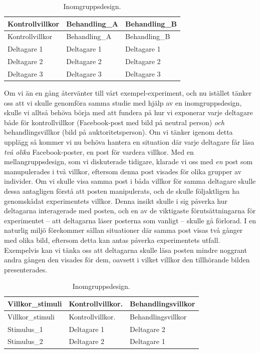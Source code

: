 \documentclass[
]{book}
\begin{document}
\begin{longtable}[]{@{}lll@{}}
\caption{\label{tab:tab-02-07-5-4-01}Inomgruppsdesign.}\tabularnewline
\toprule
Kontrollvillkor & Behandling\_A & Behandling\_B\tabularnewline
\midrule
\endfirsthead
\toprule
Kontrollvillkor & Behandling\_A & Behandling\_B\tabularnewline
\midrule
\endhead
Deltagare 1 & Deltagare 1 & Deltagare 1\tabularnewline
Deltagare 2 & Deltagare 2 & Deltagare 2\tabularnewline
Deltagare 3 & Deltagare 3 & Deltagare 3\tabularnewline
\bottomrule
\end{longtable}

Om vi än en gång återvänter till vårt exempel-experiment, och nu istället tänker oss att vi skulle genomföra samma studie med hjälp av en inomgruppsdesign, skulle vi alltså behöva börja med att fundera på hur vi exponerar varje deltagare både för kontrollvillkor (Facebook-post med bild på neutral person) \emph{och} behandlingsvillkor (bild på auktoritetsperson). Om vi tänker igenom detta upplägg så kommer vi nu behöva hantera en situation där varje deltagare får läsa \emph{två olika} Facebook-poster, en post för vardera villkor. Med en mellangruppsdesign, som vi diskuterade tidigare, klarade vi oss med \emph{en} post som manupulerades i två villkor, eftersom denna post visades för olika grupper av individer. Om vi skulle visa samma post i båda villkor för samma deltagare skulle dessa antagligen förstå att posten manipulerats, och de skulle följaktligen ha genomskådat experimentets villkor. Denna insikt skulle i sig påverka hur deltagarna interagerade med posten, och en av de viktigaste förutsättningarna för experimentet -- att deltagarna läser posterna som vanligt -- skulle gå förlorad. I en naturlig miljö förekommer sällan situationer där samma post visas två gånger med olika bild, eftersom detta kan antas påverka experimentets utfall. Exempelvis kan vi tänka oss att deltagarna skulle läsa posten mindre noggrant andra gången den visades för dem, oavsett i vilket villkor den tillhörande bilden presenterades.

\begin{longtable}[]{@{}lll@{}}
\caption{\label{tab:tab-02-07-5-4-02}Inomgruppsdesign.}\tabularnewline
\toprule
Villkor\_stimuli & Kontrollvillkor. & Behandlingsvillkor\tabularnewline
\midrule
\endfirsthead
\toprule
Villkor\_stimuli & Kontrollvillkor. & Behandlingsvillkor\tabularnewline
\midrule
\endhead
Stimulus\_1 & Deltagare 1 & Deltagare 2\tabularnewline
Stimulus\_2 & Deltagare 2 & Deltagare 1\tabularnewline
\bottomrule
\end{longtable}
\end{document}
